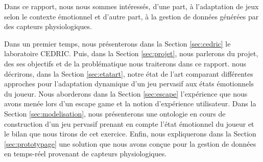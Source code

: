 \documentclass{article}
\begin{document}
	Dans ce rapport, nous nous sommes intéressés, d'une part, à l'adaptation de jeux selon le contexte émotionnel et d'autre part, à la gestion de données générées par des capteurs physiologiques.\par
	Dans un premier temps, nous présenterons dans la Section \ref{sec:cedric} le laboratoire CEDRIC.
	Puis, dans la Section \ref{sec:projet}, nous parlerons du projet, des ses objectifs et de la problématique nous traiterons dans ce rapport.
	nous décrirons, dans la Section \ref{sec:etatart}, notre état de l'art comparant différentes approches pour l'adaptation dynamique d'un jeu pervasif aux états émotionnels du joueur. 
	Nous aborderons dans la Section \ref{sec:escape} l'expérience que nous avons menée lors d'un escape game et la notion d'expérience utilisateur.
	Dans la Section \ref{sec:modelisation}, nous présenterons une ontologie en cours de construction d'un jeu pervasif prenant en compte l'état émotionnel du joueur et le bilan que nous tirons de cet exercice.
	Enfin, nous expliquerons dans la Section \ref{sec:prototypage} une solution que nous avons conçue pour la gestion de données en temps-réel provenant de capteurs physiologiques.
\end{document}
